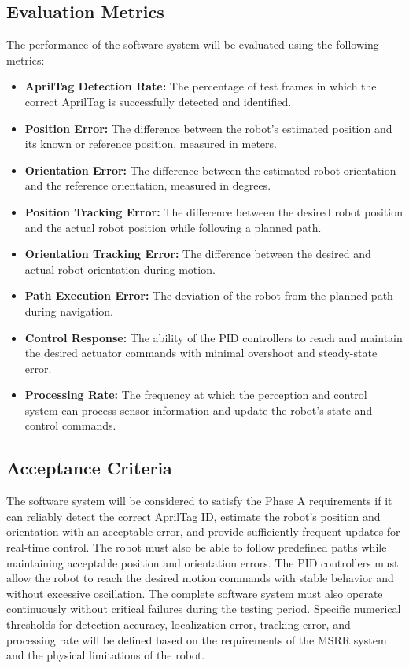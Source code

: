 \documentclass[12pt,a4paper]{article}
\begin{document}
	\subsection{Evaluation Metrics}
	The performance of the software system will be evaluated using the following metrics:
		\begin{itemize}
		\item \textbf{AprilTag Detection Rate:} The percentage of test frames in which the correct AprilTag is successfully detected and identified.
		\item \textbf{Position Error:} The difference between the robot's estimated position and its known or reference position, measured in meters.
		\item \textbf{Orientation Error:} The difference between the estimated robot orientation and the reference orientation, measured in degrees.
		\item \textbf{Position Tracking Error:} The difference between the desired robot position and the actual robot position while following a planned path.
		\item \textbf{Orientation Tracking Error:} The difference between the desired and actual robot orientation during motion.
		\item \textbf{Path Execution Error:} The deviation of the robot from the planned path during navigation.
		\item \textbf{Control Response:} The ability of the PID controllers to reach and maintain the desired actuator commands with minimal overshoot and steady-state error.
		\item \textbf{Processing Rate:} The frequency at which the perception and control system can process sensor information and update the robot's state and control commands.
		\end{itemize}

	\subsection{Acceptance Criteria}
	The software system will be considered to satisfy the Phase A requirements if it can reliably detect the correct AprilTag ID, estimate the robot's position and orientation with an acceptable error, and provide sufficiently frequent updates for real-time control. The robot must also be able to follow predefined paths while maintaining acceptable position and orientation errors.
	The PID controllers must allow the robot to reach the desired motion commands with stable behavior and without excessive oscillation. The complete software system must also operate continuously without critical failures during the testing period.
	Specific numerical thresholds for detection accuracy, localization error, tracking error, and processing rate will be defined based on the requirements of the MSRR system and the physical limitations of the robot.
\end{document}
